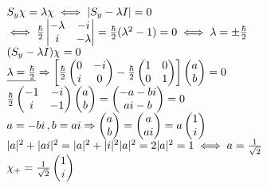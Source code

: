 \documentclass[14pt]{extarticle}
\makeatletter
\newenvironment{lefteqs}{%
    \begin{english}%
    \begin{flushleft}%
    \renewcommand{\arraystretch}{1.3}%
    $\begin{array}{@{}l@{}}%
}{%
    \end{array}$%
    \end{flushleft}%
    \end{english}%
}
\makeatother
\begin{document}
\begin{lefteqs}
    S_y \chi = \lambda \chi \iff |S_y - \lambda I| = 0 \\
    \iff \frac{\hbar}{2} \begin{vmatrix}
        -\lambda & -i \\
        i & -\lambda
    \end{vmatrix} = \frac{\hbar}{2}(\lambda^2 - 1) = 0 \iff \lambda = \pm \frac{\hbar}{2} \\
    (S_y - \lambda I) \chi = 0 \\
    \underline{\lambda = \frac{\hbar}{2}} \Rightarrow \left[ \frac{\hbar}{2} \begin{pmatrix}
        0 & -i \\
        i & 0
    \end{pmatrix} - \frac{\hbar}{2} \begin{pmatrix}
        1 & 0 \\
        0 & 1
    \end{pmatrix} \right] \begin{pmatrix}
        a \\
        b
    \end{pmatrix} = 0 \\
    \frac{\hbar}{2} \begin{pmatrix}
        -1 & -i \\
        i & -1
    \end{pmatrix} \begin{pmatrix}
        a \\
        b
    \end{pmatrix} = \begin{pmatrix}
        -a -bi \\
        ai - b
    \end{pmatrix} = 0 \\
    a=-bi\, , b=ai \Rightarrow \begin{pmatrix}
        a \\
        b
    \end{pmatrix} = \begin{pmatrix}
        a \\
        ai
    \end{pmatrix} = a \begin{pmatrix}
        1 \\
        i
    \end{pmatrix} \\
    |a|^2 + |ai|^2 = |a|^2 + |i|^2|a|^2 = 2|a|^2=1 \iff a=\frac{1}{\sqrt{2}} \\
    \chi_+ = \frac{1}{\sqrt{2}} \begin{pmatrix}
        1 \\
        i
    \end{pmatrix} \\
    

\end{lefteqs}
\end{document}
